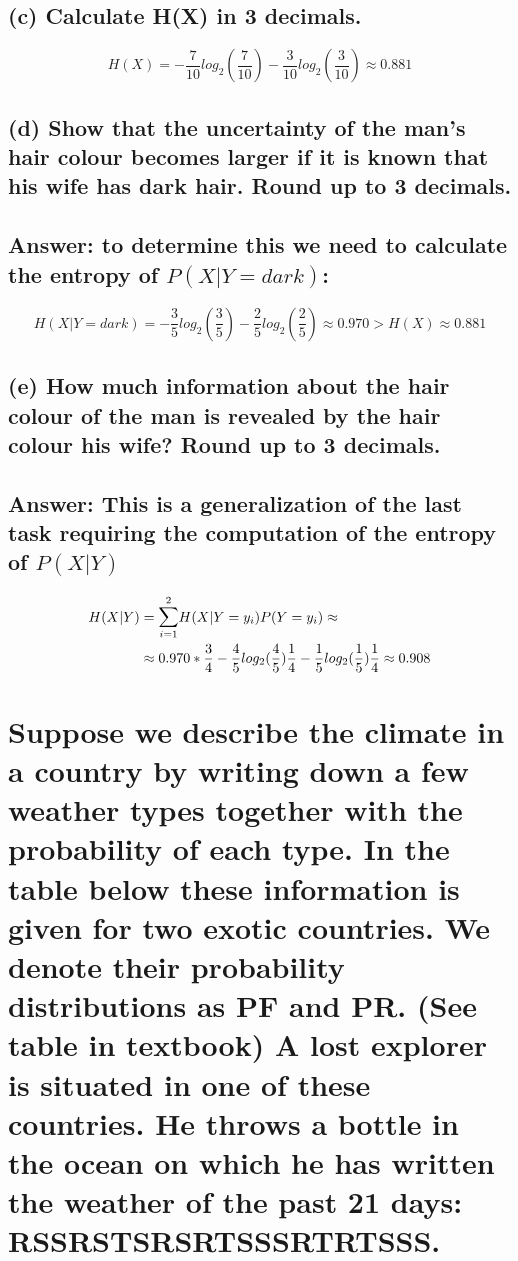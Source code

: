 \documentclass[11px]{article}
\begin{document}
\subsection*{\normalfont(c) Calculate H(X) in 3 decimals.}
\begin{equation}
H(X) = -\frac{7}{10}log_2(\frac{7}{10}) - \frac{3}{10}log_2(\frac{3}{10}) \approx 0.881
\end{equation}

\subsection*{\normalfont (d) Show that the uncertainty of the man's hair colour becomes larger if it is known that his
wife has dark hair. Round up to 3 decimals.}

\subsection*{Answer: to determine this we need to calculate the entropy of \(P(X|Y = dark)\):}
\begin{equation}
H(X|Y = dark) = -\frac{3}{5}log_2(\frac{3}{5}) - \frac{2}{5}log_2(\frac{2}{5}) \approx 0.970 > H(X) \approx 0.881
\end{equation}

\subsection*{\normalfont (e) How much information about the hair colour of the man is revealed by the hair colour his wife? Round up to 3 decimals.}

\subsection*{Answer: This is a generalization of the last task requiring the computation of the entropy of \(P(X|Y)\)}

\begin{equation}
\begin{split}
H(X|Y) & = \mathlarger{\sum}_{i=1}^{2} H(X|Y = y_i)P(Y = y_i) \approx \\
& \approx 0.970*\frac{3}{4} - \frac{4}{5}log_2(\frac{4}{5})\frac{1}{4} - \frac{1}{5}log_2(\frac{1}{5})\frac{1}{4} \approx 0.908
\end{split}
\end{equation}


\section{Suppose we describe the climate in a country by writing down a few weather types together with the probability of each type. In the table below these information is given for two exotic countries. We denote their probability distributions as PF and PR. (See table in textbook) A lost explorer is situated in one of these countries. He throws a bottle in the ocean on which he has written the weather of the past 21 days: RSSRSTSRSRTSSSRTRTSSS.}
\end{document}

